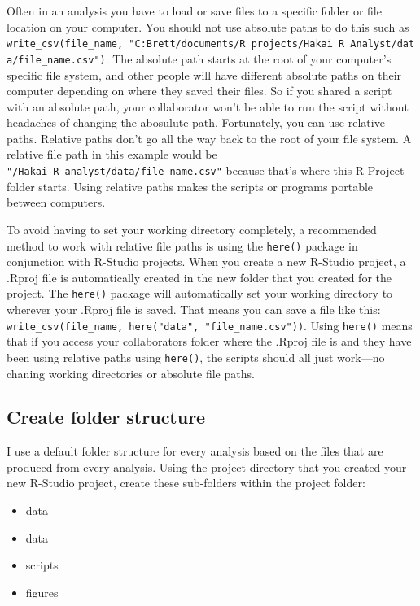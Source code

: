 \documentclass[]{book}
\providecommand{\tightlist}{%
  \setlength{\itemsep}{0pt}\setlength{\parskip}{0pt}}
\begin{document}
Often in an analysis you have to load or save files to a specific folder
or file location on your computer. You should not use absolute paths to
do this such as
\texttt{write\_csv(file\_name,\ "C:Brett/documents/R\ projects/Hakai\ R\ Analyst/data/file\_name.csv")}.
The absolute path starts at the root of your computer's specific file
system, and other people will have different absolute paths on their
computer depending on where they saved their files. So if you shared a
script with an absolute path, your collaborator won't be able to run the
script without headaches of changing the abosulute path. Fortunately,
you can use relative paths. Relative paths don't go all the way back to
the root of your file system. A relative file path in this example would
be \texttt{"/Hakai\ R\ analyst/data/file\_name.csv"} because that's
where this R Project folder starts. Using relative paths makes the
scripts or programs portable between computers.

To avoid having to set your working directory completely, a recommended
method to work with relative file paths is using the \texttt{here()}
package in conjunction with R-Studio projects. When you create a new
R-Studio project, a .Rproj file is automatically created in the new
folder that you created for the project. The \texttt{here()} package
will automatically set your working directory to wherever your .Rproj
file is saved. That means you can save a file like this:
\texttt{write\_csv(file\_name,\ here("data",\ "file\_name.csv"))}. Using
\texttt{here()} means that if you access your collaborators folder where
the .Rproj file is and they have been using relative paths using
\texttt{here()}, the scripts should all just work---no chaning working
directories or absolute file paths.

\subsection{Create folder structure}\label{create-folder-structure}

I use a default folder structure for every analysis based on the files
that are produced from every analysis. Using the project directory that
you created your new R-Studio project, create these sub-folders within
the project folder:

\begin{itemize}
\tightlist
\item
  data
\item
  data
\item
  scripts
\item
  figures
\end{itemize}
\end{document}
